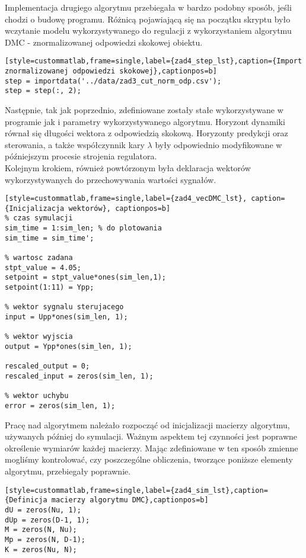 Implementacja drugiego algorytmu przebiegała w bardzo podobny sposób, jeśli chodzi o budowę programu. Różnicą pojawiającą się na początku skryptu było wczytanie modelu wykorzystywanego do regulacji z wykorzystaniem algorytmu DMC - znormalizowanej odpowiedzi skokowej obiektu.

\begin{lstlisting}
[style=custommatlab,frame=single,label={zad4_step_lst},caption={Import znormalizowanej odpowiedzi skokowej},captionpos=b]
step = importdata('../data/zad3_cut_norm_odp.csv');
step = step(:, 2);
\end{lstlisting}

Następnie, tak jak poprzednio, zdefiniowane zostały stałe wykorzystywane w programie jak i parametry wykorzystywanego algorytmu. Horyzont dynamiki równał się długości wektora z odpowiedzią skokową. Horyzonty predykcji oraz sterowania, a także współczynnik kary $\lambda$ były odpowiednio modyfikowane w późniejszym procesie strojenia regulatora. \\
\indent{} Kolejnym krokiem, również powtórzonym była deklaracja wektorów wykorzystywanych do przechowywania wartości sygnałów.


\begin{lstlisting}
[style=custommatlab,frame=single,label={zad4_vecDMC_lst}, caption={Inicjalizacja wektorów}, captionpos=b]
% czas symulacji
sim_time = 1:sim_len; % do plotowania
sim_time = sim_time';

% wartosc zadana
stpt_value = 4.05;
setpoint = stpt_value*ones(sim_len,1);
setpoint(1:11) = Ypp;

% wektor sygnalu sterujacego
input = Upp*ones(sim_len, 1);

% wektor wyjscia
output = Ypp*ones(sim_len, 1);

rescaled_output = 0;
rescaled_input = zeros(sim_len, 1);

% wektor uchybu
error = zeros(sim_len, 1);

\end{lstlisting}

Pracę nad algorytmem należało rozpocząć od inicjalizacji macierzy algorytmu, używanych później do symulacji. Ważnym aspektem tej czynności jest poprawne określenie wymiarów każdej macierzy. Mając zdefiniowane w ten sposób zmienne mogliśmy kontrolować, czy poszczególne obliczenia, tworzące poniższe elementy algorytmu, przebiegały poprawnie.
\\

\begin{lstlisting}
[style=custommatlab,frame=single,label={zad4_sim_lst},caption={Definicja macierzy algorytmu DMC},captionpos=b]
dU = zeros(Nu, 1);
dUp = zeros(D-1, 1);
M = zeros(N, Nu);
Mp = zeros(N, D-1);
K = zeros(Nu, N);
\end{lstlisting}

